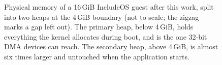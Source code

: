 \begin{figure}[htb]
\caption{Physical memory of a 16\,GiB IncludeOS guest after this work,
  split into two heaps at the 4\,GiB boundary (not to scale; the zigzag
  marks a gap left out). The primary heap, below 4\,GiB, holds everything
  the kernel allocates during boot, and is the one 32-bit DMA devices can
  reach. The secondary heap, above 4\,GiB, is almost six times larger and
  untouched when the application starts.}
\label{fig:heap-regions}
\end{figure}
